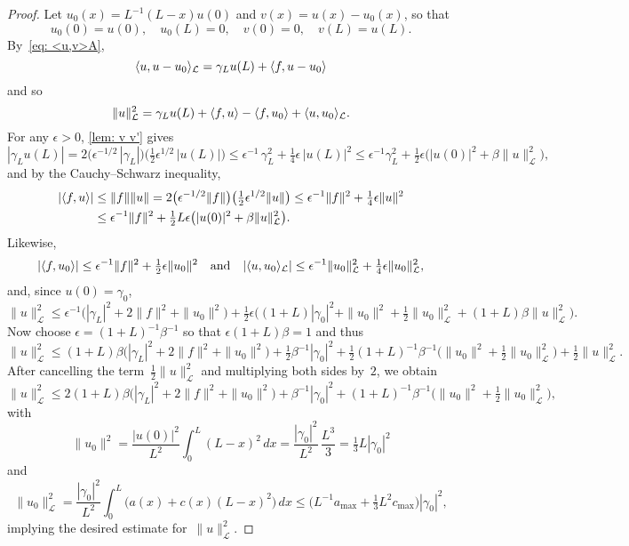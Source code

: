 \begin{proof}
Let $u_0(x)=L^{-1}(L-x)u(0)$ and $v(x)=u(x)-u_0(x)$, so that
\[
u_0(0)=u(0),\quad u_0(L)=0,\quad v(0)=0,\quad v(L)=u(L).
\]
By~\eqref{eq: <u,v>A},
\[
\langle u,u-u_0\rangle_{\mathcal{L}}=\gamma_Lu(L)+\langle f,u-u_0\rangle
\]
and so
\[
\|u\|_{\mathcal{L}}^2=\gamma_L u(L)+\langle f,u\rangle-\langle f,u_0\rangle
	+\langle u,u_0\rangle_{\mathcal{L}}.
\]
For any $\epsilon>0$, \cref{lem: v v'} gives
\[
|\gamma_L u(L)|=2\bigl(\epsilon^{-1/2}\,|\gamma_L|\bigr)
	\bigl(\tfrac12\epsilon^{1/2}\,|u(L)|\bigr)
\le\epsilon^{-1}\,\gamma_L^2
	+\tfrac14\epsilon\,|u(L)|^2
	\le\epsilon^{-1}\gamma_L^2+\tfrac12\epsilon\bigl(|u(0)|^2
	+\beta\|u\|_{\mathcal{L}}^2\bigr),
\]
and by the Cauchy--Schwarz inequality,
\begin{align*}
|\langle f,u\rangle|&\le\|f\|\|u\|=2\bigl(\epsilon^{-1/2}\|f\|\bigr)
	\bigl(\tfrac12\epsilon^{1/2}\|u\|\bigr)
	\le\epsilon^{-1}\|f\|^2+\tfrac14\epsilon\|u\|^2\\
	&\le\epsilon^{-1}\|f\|^2
	+\tfrac12 L\epsilon\bigl(|u(0)|^2+\beta\|u\|_{\mathcal{L}}^2\bigr).
\end{align*}
Likewise,
\[
|\langle f,u_0\rangle|\le\epsilon^{-1}\|f\|^2+\tfrac12\epsilon\|u_0\|^2
\quad\text{and}\quad
|\langle u,u_0\rangle_{\mathcal{L}}|\le\epsilon^{-1}\|u_0\|_{\mathcal{L}}^2
	+\tfrac14\epsilon\|u_0\|_{\mathcal{L}}^2,
\]
and, since $u(0)=\gamma_0$,
\[
\|u\|_{\mathcal{L}}^2\le\epsilon^{-1}\bigl(|\gamma_L|^2+2\|f\|^2+\|u_0\|^2\bigr)
+\tfrac12\epsilon\bigl((1+L)|\gamma_0|^2+\|u_0\|^2
	+\tfrac12\|u_0\|_{\mathcal{L}}^2+(1+L)\beta\|u\|_{\mathcal{L}}^2\bigr).
\]
Now choose $\epsilon=(1+L)^{-1}\beta^{-1}$ so that $\epsilon(1+L)\beta=1$ and 
thus
\[
\|u\|_{\mathcal{L}}^2\le(1+L)\beta\bigl(|\gamma_L|^2+2\|f\|^2+\|u_0\|^2\bigr)
	+\tfrac12\beta^{-1}|\gamma_0|^2+\tfrac12(1+L)^{-1}\beta^{-1}
	\bigl(\|u_0\|^2+\tfrac12\|u_0\|_{\mathcal{L}}^2\bigr)
	+\tfrac12\|u\|_{\mathcal{L}}^2.
\]
After cancelling the term~$\tfrac12\|u\|_{\mathcal{L}}^2$ and multiplying both
sides by~$2$, we obtain
\[
\|u\|_{\mathcal{L}}^2\le2(1+L)\beta\bigl(|\gamma_L|^2+2\|f\|^2+\|u_0\|^2\bigr)
	+\beta^{-1}|\gamma_0|^2+(1+L)^{-1}\beta^{-1}
	\bigl(\|u_0\|^2+\tfrac12\|u_0\|_{\mathcal{L}}^2\bigr),
\]
with
\[
\|u_0\|^2=\frac{|u(0)|^2}{L^2}\int_0^L(L-x)^2\,dx
	=\frac{|\gamma_0|^2}{L^2}\,\frac{L^3}{3}=\tfrac13L|\gamma_0|^2
\]
and
\[
\|u_0\|_{\mathcal{L}}^2=\frac{|\gamma_0|^2}{L^2}\int_0^L\bigl(
	a(x)+c(x)(L-x)^2\bigr)\,dx
	\le\bigl(L^{-1}a_{\max}+\tfrac13L^2c_{\max}\bigr)|\gamma_0|^2,
\]
implying the desired estimate for~$\|u\|_{\mathcal{L}}^2$.
\end{proof}

